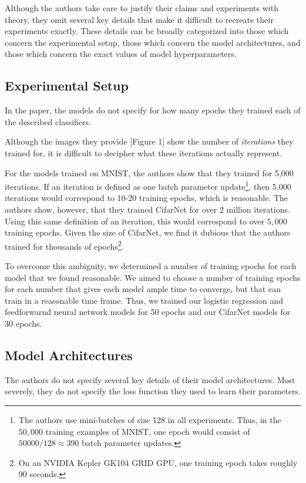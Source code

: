 \documentclass[letterpaper, 10 pt, conference]{ieeeconf}  %
\begin{document}
Although the authors take care to justify their claims and experiments with theory, they omit several key details that make it difficult to recreate their experiments exactly. These details can be broadly categorized into those which concern the experimental setup, those which concern the model architectures, and those which concern the exact values of model hyperparameters. 

\subsection{Experimental Setup}

In the paper, the models do not specify for how many epochs they trained each of the described classifiers.

Although the images they provide [Figure 1] show the number of \emph{iterations} they trained for, it is difficult to decipher what these iterations actually represent. 

For the models trained on MNIST, the authors show that they trained for 5,000 iterations. If an iteration is defined as one batch parameter update\footnote{The authors use mini-batches of size 128 in all experiments. Thus, in the $50,000$ training examples of MNIST, one epoch would consist of $50000/128 \approx 390$ batch parameter updates.}, then 5,000 iterations would correspond to 10-20 training epochs, which is reasonable. The authors show, however, that they trained CifarNet for over 2 million iterations. Using this same definition of an iteration, this would correspond to over $5,000$ training epochs. Given the size of CifarNet, we find it dubious that the authors trained for thousands of epochs\footnote{On an NVIDIA Kepler GK104 GRID GPU, one training epoch takes roughly 90 seconds.}.

To overcome this ambiguity, we determined a number of training epochs for each model that we found reasonable. We aimed to choose a number of training epochs for each number that gives each model ample time to converge, but that can train in a reasonable time frame. Thus, we trained our logistic regression and feedforwarnd neural network models for 50 epochs and our CifarNet models for 30 epochs. 

\subsection{Model Architectures}

The authors do not specify several key details of their model architectures. Most severely, they do not specify the loss function they used to learn their parameters. 
\end{document}
